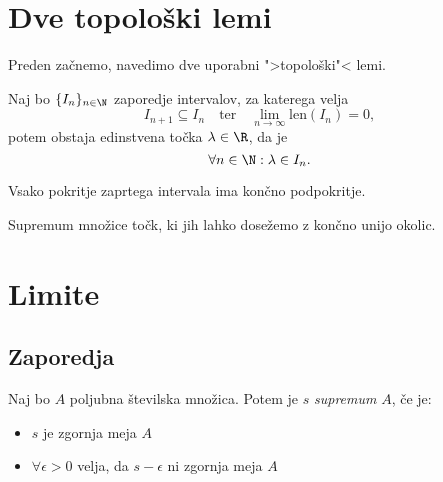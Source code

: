 \documentclass[12pt, a4paper, unicode]{article}
\begin{document}
\renewcommand{\headheight}{20pt}

\pagestyle{Priprave}

\maketitle

\newpage

\tableofcontents

\newpage

\section{Dve topološki lemi}
Preden začnemo, navedimo dve uporabni ">topološki"< lemi.

\begin{lema}
Naj bo $\{I_n\}_{n \in \N}$ zaporedje intervalov, za katerega velja $$I_{n+1} \subseteq I_n \quad  \text{ter} \quad \lim_{n \to \infty} \text{len}(I_n) = 0,$$ potem obstaja edinstvena točka $\lambda \in \R$, da je $$\forall n \in \N : \lambda \in I_n .$$
\end{lema}

\begin{lema}
Vsako pokritje zaprtega intervala ima končno podpokritje.
\end{lema}
\begin{oris}
Supremum množice točk, ki jih lahko dosežemo z končno unijo okolic.
\end{oris}

\newpage
\section{Limite}

\subsection{Zaporedja}

\begin{izrek}[Supremum]
Naj bo $A$ poljubna številska množica. Potem je $s$ \textit{supremum} $A$, če je:
\begin{itemize}
    \item $s$ je zgornja meja $A$
    \item $\forall \epsilon > 0$ velja, da $s - \epsilon$ ni zgornja meja $A$
\end{itemize}
\end{izrek}
\end{document}
